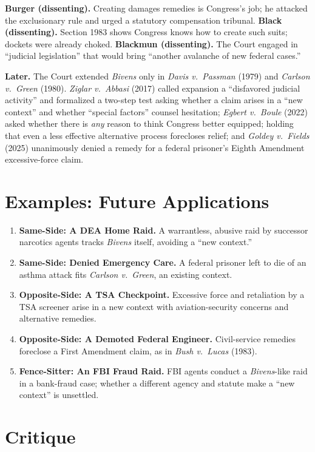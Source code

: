 \documentclass[12pt]{article}
\begin{document}
\textbf{Burger (dissenting).} Creating damages remedies is Congress's job; he attacked the exclusionary rule and urged a statutory compensation tribunal. \textbf{Black (dissenting).} Section 1983 shows Congress knows how to create such suits; dockets were already choked. \textbf{Blackmun (dissenting).} The Court engaged in ``judicial legislation'' that would bring ``another avalanche of new federal cases.''

\textbf{Later.} The Court extended \textit{Bivens} only in \textit{Davis v.\ Passman} (1979) and \textit{Carlson v.\ Green} (1980). \textit{Ziglar v.\ Abbasi} (2017) called expansion a ``disfavored judicial activity'' and formalized a two-step test asking whether a claim arises in a ``new context'' and whether ``special factors'' counsel hesitation; \textit{Egbert v.\ Boule} (2022) asked whether there is \textit{any} reason to think Congress better equipped; holding that even a less effective alternative process forecloses relief; and \textit{Goldey v.\ Fields} (2025) unanimously denied a remedy for a federal prisoner's Eighth Amendment excessive-force claim.

\section{Examples: Future Applications}

\begin{enumerate}
\item \textbf{Same-Side: A DEA Home Raid.} A warrantless, abusive raid by successor narcotics agents tracks \textit{Bivens} itself, avoiding a ``new context.''
\item \textbf{Same-Side: Denied Emergency Care.} A federal prisoner left to die of an asthma attack fits \textit{Carlson v.\ Green}, an existing context.
\item \textbf{Opposite-Side: A TSA Checkpoint.} Excessive force and retaliation by a TSA screener arise in a new context with aviation-security concerns and alternative remedies.
\item \textbf{Opposite-Side: A Demoted Federal Engineer.} Civil-service remedies foreclose a First Amendment claim, as in \textit{Bush v.\ Lucas} (1983).
\item \textbf{Fence-Sitter: An FBI Fraud Raid.} FBI agents conduct a \textit{Bivens}-like raid in a bank-fraud case; whether a different agency and statute make a ``new context'' is unsettled.
\end{enumerate}

\section{Critique}
\end{document}
